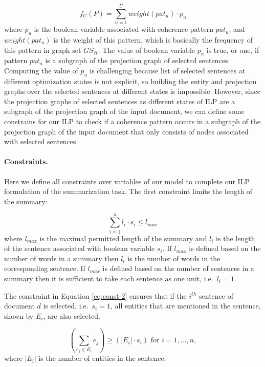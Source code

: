 \begin{equation}
f_C(P) = \sum_{u=1}^{U}{weight(pat_u) \cdot p_u}
\end{equation}
where $p_u$ is the boolean variable associated with coherence pattern $pat_u$, and $weight(pat_u)$ is the weight of this pattern, which is basically the frequency of this pattern in graph set $GS_H$. 
The value of boolean variable $p_u$ is true, or one, if pattern $pat_u$ is a subgraph of the projection graph of selected sentences. 
Computing the value of $p_u$ is challenging because list of selected sentences at different optimization states is not explicit, so building the entity and projection graphs over the selected sentences at different states is impossible. 
However, since the projection graphs of selected sentences as different states of ILP are a subgraph of the projection graph of the input document, we can define some constrains for our ILP to check if a coherence pattern occurs in a subgraph of the projection graph of the input document that only consists of nodes associated with selected sentences. 

\paragraph{Constraints.}
Here we define all constraints over variables of our model to complete our ILP formulation of the summarization task. 
The first constraint limits the length of the summary:

\begin{equation}
\sum_{i=1}^{n} l_i \cdot s_i \le l_{max}
\end{equation}
where $l_{max}$ is the maximal permitted length of the summary and $l_i$ is the length of the sentence associated with boolean variable $s_i$.  
If $l_{max}$ is defined based on the number of words in a summary then $l_i$ is the number of words in the corresponding sentence.  
If $l_{max}$ is defined based on the number of sentences in a summary then it is sufficient to take each sentence as one unit, i.e.\ $l_i=1$. 

The constraint in Equation \ref{eq:const-2} ensures that if the $i^{th}$ sentence of document $d$ is selected, i.e.\ $s_i = 1$, all entities that are mentioned in the sentence, shown by $E_i$, are also selected. 

\begin{equation}
\label{eq:const-2}
( \sum_{e_j\in E_i}{e_j} )  \ge (|E_i| \cdot s_i) \text{   for   }i = 1,...,n,
\end{equation} 
where $|E_i|$ is the number of entities in the sentence.  

